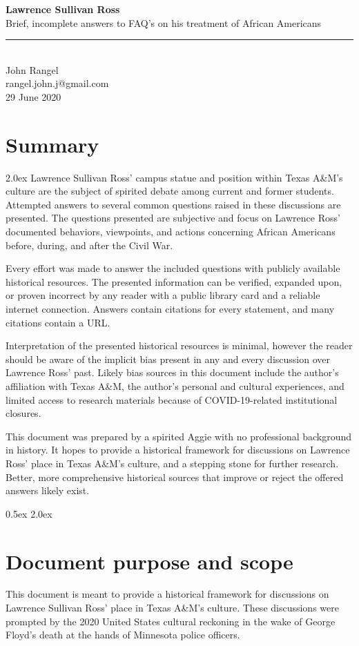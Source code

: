 \documentclass[12pt]{article}
\begin{document}
\Large{\textbf{Lawrence Sullivan Ross \\}}
\large{Brief, incomplete answers to FAQ's on his treatment of African Americans \\}
\rule{\textwidth}{1pt}
\\John Rangel\\rangel.john.j@gmail.com\\29 June 2020
\section{Summary}
\parskip 2.0ex
Lawrence Sullivan Ross' campus statue and position within Texas A\&M's culture are the subject of spirited debate among current and former students. Attempted answers to several common questions raised in these discussions are presented. The questions presented are subjective and focus on Lawrence Ross' documented behaviors, viewpoints, and actions concerning African Americans before, during, and after the Civil War. 

Every effort was made to answer the included questions with publicly available historical resources. The presented information can be verified, expanded upon, or proven incorrect by any reader with a public library card and a reliable internet connection. Answers contain citations for every statement, and many citations contain a URL. 

Interpretation of the presented historical resources is minimal, however the reader should be aware of the implicit bias present in any and every discussion over Lawrence Ross' past. Likely bias sources in this document include the author's affiliation with Texas A\&M, the author's personal and cultural experiences, and limited access to research materials because of COVID-19-related institutional closures.

This document was prepared by a spirited Aggie with no professional background in history. It hopes to provide a historical framework for discussions on Lawrence Ross' place in Texas A\&M's culture, and a stepping stone for further research. Better, more comprehensive historical sources that improve or reject the offered answers likely exist. 

\parskip 0.5ex
\newpage
\tableofcontents
\parskip 2.0ex

\newpage
\section{Document purpose and scope}
This document is meant to provide a historical framework for discussions on Lawrence Sullivan Ross' place in Texas A\&M's culture. These discussions were prompted by the 2020 United States cultural reckoning in the wake of George Floyd's death at the hands of Minnesota police officers. 
\end{document}

